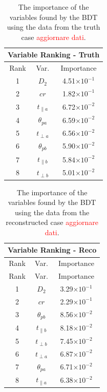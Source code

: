 \documentclass[10pt,a4paper]{book}
\newcommand\todo[1]{\textcolor{red}{#1}}
\begin{document}
\begin{table}[!htb]
\centering
\begin{tabular}{|c|c|c|}
\hline 
\multicolumn{3}{|c|}{Variable Ranking - Truth} \\ 
\hline 
Rank & Var. & Importance \\ 
\hline 
1 & $D_2$ & 4.51$\times 10^{-1}$ \\ 
\hline 
2 & $cr$ & 1.82$\times 10^{-1}$ \\ 
\hline 
3 & $t_{\parallel a}$ & 6.72$\times 10^{-2}$ \\ 
\hline 
4 & $\theta_{pa}$ & 6.59$\times 10^{-2}$ \\ 
\hline 
5 & $t_{\perp a}$ & 6.56$\times 10^{-2}$ \\ 
\hline 
6 & $\theta_{pb}$  & 5.90$\times 10^{-2}$ \\ 
\hline 
7 & $t_{\parallel b}$ & 5.84$\times 10^{-2}$ \\ 
\hline 
8 & $t_{\perp b}$& 5.01$\times 10^{-2}$ \\ 
\hline 
\end{tabular} 
\label{variable ranking true}
\caption{The importance of the variables found by the BDT using the data from the truth case \todo{aggiornare dati}.}
\end{table}

\begin{table}[!htb]
\centering
\begin{tabular}{|c|c|c|}
\hline 
\multicolumn{3}{|c|}{Variable Ranking - Reco} \\ 
\hline 
Rank & Var. & Importance \\ 
\hline 
Rank & Var. & Importance \\ 
\hline 
1 & $D_2$ & 3.29$\times 10^{-1}$ \\ 
\hline 
2 & $cr$ & 2.29$\times 10^{-1}$ \\ 
\hline 
3 & $\theta_{pb}$ & 8.56$\times 10^{-2}$ \\ 
\hline 
4 & $t_{\parallel b}$ & 8.18$\times 10^{-2}$ \\ 
\hline 
5 & $t_{\perp b}$ & 7.45$\times 10^{-2}$ \\ 
\hline 
6 & $t_{\perp a}$  & 6.87$\times 10^{-2}$ \\ 
\hline 
7 & $\theta_{pa}$ & 6.71$\times 10^{-2}$ \\ 
\hline 
8 & $t_{\parallel a}$ & 6.38$\times 10^{-2}$ \\ 
\hline 
\end{tabular} 
\label{variable ranking reco}
\caption{The importance of the variables found by the BDT using the data from the reconstructed case \todo{aggiornare dati}.}
\end{table}
\end{document}
